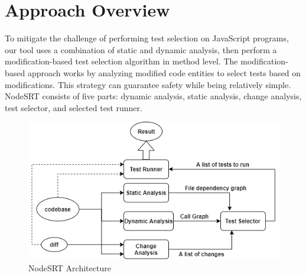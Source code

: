 \documentclass[10pt, conference]{IEEEtran}
\begin{document}
\section{Approach Overview}
To mitigate the challenge of performing test selection on JavaScript programs, our tool uses a combination of static and dynamic analysis, then perform a modification-based test 
selection algorithm in method level. The modification-based approach works by analyzing modified code entities 
to select tests based on modifications. This strategy can guarantee safety while being relatively simple. NodeSRT consists of five parts: dynamic analysis, static analysis, change analysis, 
test selector, and selected test runner. 
\begin{figure}[htbp]
    \centerline{\includegraphics[scale=0.45]{NodeSRT Architecture.png}}
    \caption{NodeSRT Architecture}
    \label{fig}
    \end{figure}    
\end{document}
